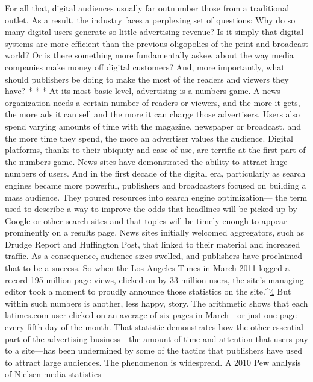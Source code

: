 For all that, digital audiences usually far outnumber those from a traditional
outlet. As a result, the industry faces a perplexing set of questions: Why do so
many digital users generate so little advertising revenue? Is it simply that digital
systems are more efficient than the previous oligopolies of the print and broadcast
world? Or is there something more fundamentally askew about the way
media companies make money off digital customers? And, more importantly,
what should publishers be doing to make the most of the readers and viewers
they have?
* * *
At its most basic level, advertising is a numbers game. A news organization
needs a certain number of readers or viewers, and the more it gets, the more ads
it can sell and the more it can charge those advertisers. Users also spend varying
amounts of time with the magazine, newspaper or broadcast, and the more time
they spend, the more an advertiser values the audience.
Digital platforms, thanks to their ubiquity and ease of use, are terrific at the
first part of the numbers game. News sites have demonstrated the ability to attract
huge numbers of users. And in the first decade of the digital era, particularly as
search engines became more powerful, publishers and broadcasters focused on
building a mass audience. They poured resources into search engine optimization—
the term used to describe a way to improve the odds that headlines will be
picked up by Google or other search sites and that topics will be timely enough
to appear prominently on a results page. News sites initially welcomed aggregators,
such as Drudge Report and Huffington Post, that linked to their material
and increased traffic.
As a consequence, audience sizes swelled, and publishers have proclaimed that
to be a success. So when the Los Angeles Times in March 2011 logged a record
195 million page views, clicked on by 33 million users, the site's managing editor
took a moment to proudly announce those statistics on the site.^{\href{#endnotes-chapter-2}{4}}%
But within such numbers is another, less happy, story. The arithmetic shows
that each latimes.com user clicked on an average of six pages in March—or just
one page every fifth day of the month. That statistic demonstrates how the other
essential part of the advertising business—the amount of time and attention that
users pay to a site—has been undermined by some of the tactics that publishers
have used to attract large audiences.
The phenomenon is widespread. A 2010 Pew analysis of Nielsen media statistics
